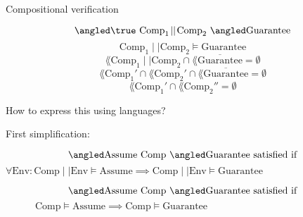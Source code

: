 \documentclass[../talk.tex]{subfiles}
\begin{document}
\begin{frame}{Compositional verification}
    \begin{overlayarea}{\slidewidth}{\slideheight}

        {%
            \[
                \relyguarantee{\true}{\text{Comp}_1 \!\mid\mid\! \text{Comp}_2}
                {\text{Guarantee}}
            \]
        }%
        {%
            \[
                \text{Comp}_1 \!\mid\mid\! \text{Comp}_2
                \models
                \text{Guarantee}
            \]
        }%
        {%
            \[
                \lang{ \text{Comp}_1 \!\mid\mid\! \text{Comp}_2 }
                \cap
                \lang{ \overline{\text{Guarantee}}}
                = \emptyset
            \]
        }%
        {%
            \[
                \lang{ \text{Comp}_1'} \cap \lang{ \text{Comp}_2' }
                \cap
                \lang{ \overline{\text{Guarantee}}}
                = \emptyset
            \]
        }%
        {%
            \[
                \lang{ \text{Comp}_1'} \cap \lang{ \text{Comp}_2'' }
                = \emptyset
            \]
        }%

        \vspace*{1em}

        How to express this using \alert{languages}?
        {%
            \vspace*{1em}

            First simplification:

            {%
                \[
                    \relyguarantee{\text{Assume}}{\text{Comp}}{\text{Guarantee}}
                    \text{ satisfied if}
                \]
                \(
                    \forall \text{Env} \colon \text{Comp} \!\mid\mid\! \text{Env} \models \text{Assume}
                    \implies
                    \text{Comp} \!\mid\mid\! \text{Env} \models \text{Guarantee}
                \)
            }%
            {%
                \[
                    \relyguarantee{\text{Assume}}{\text{Comp}}{\text{Guarantee}}
                    \text{ satisfied if}
                \]
                \(
                    \qquad \quad  \text{Comp} \models \text{Assume}
                    \implies
                    \text{Comp} \models \text{Guarantee}
                \)

                \vspace*{1em}

}}
\end{overlayarea}
\end{frame}
\end{document}
